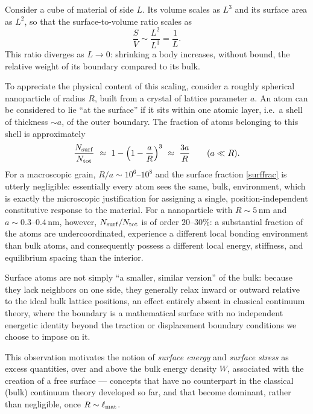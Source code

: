 Consider a cube of material of side $L$. Its volume scales as $L^3$ and its surface area as $L^2$, so that the surface-to-volume ratio scales as
\begin{equation}
	\frac{S}{V}\sim \frac{L^2}{L^3}=\frac{1}{L}.
\end{equation}
This ratio diverges as $L\to 0$: shrinking a body increases, without bound, the relative weight of its boundary compared to its bulk.

To appreciate the physical content of this scaling, consider a roughly spherical nanoparticle of radius $R$, built from a crystal of lattice parameter $a$. An atom can be considered to lie ``at the surface'' if it sits within one atomic layer, i.e.\ a shell of thickness $\sim a$, of the outer boundary. The fraction of atoms belonging to this shell is approximately
\begin{equation}\label{surffrac}
	\frac{N_{\rm surf}}{N_{\rm tot}}\ \approx\ 1-\left(1-\frac{a}{R}\right)^{3}\ \approx\ \frac{3a}{R}\qquad (a\ll R).
\end{equation}
For a macroscopic grain, $R/a\sim 10^{6}$--$10^{8}$ and the surface fraction \eqref{surffrac} is utterly negligible: essentially every atom sees the same, bulk, environment, which is exactly the microscopic justification for assigning a single, position-independent constitutive response to the material. For a nanoparticle with $R\sim 5\,\mathrm{nm}$ and $a\sim 0.3$--$0.4\,\mathrm{nm}$, however, $N_{\rm surf}/N_{\rm tot}$ is of order $20$--$30\%$: a substantial fraction of the atoms are undercoordinated, experience a different local bonding environment than bulk atoms, and consequently possess a different local energy, stiffness, and equilibrium spacing than the interior.

\begin{remark}
	Surface atoms are not simply ``a smaller, similar version'' of the bulk: because they lack neighbors on one side, they generally relax inward or outward relative to the ideal bulk lattice positions, an effect entirely absent in classical continuum theory, where the boundary is a mathematical surface with no independent energetic identity beyond the traction or displacement boundary conditions we choose to impose on it.
\end{remark}

This observation motivates the notion of \textit{surface energy} and \textit{surface stress} as excess quantities, over and above the bulk energy density $W$, associated with the creation of a free surface --- concepts that have no counterpart in the classical (bulk) continuum theory developed so far, and that become dominant, rather than negligible, once $R\sim\ell_{\rm mat}$.

